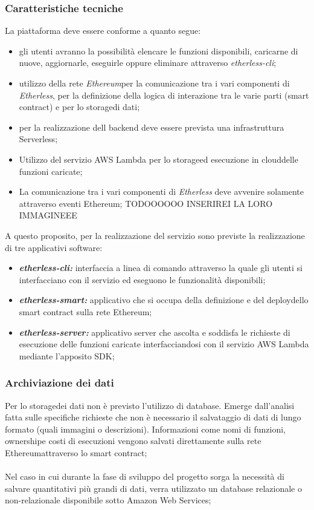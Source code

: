 \subsubsection{Caratteristiche tecniche}
La piattaforma deve essere conforme a quanto segue:
\begin{itemize}
	\item gli utenti avranno la possibilità elencare le funzioni disponibili,  caricarne di nuove, aggiornarle, eseguirle oppure eliminare attraverso \textit{etherless-cli};
	\item utilizzo della rete \textit{Ethereum}\glo per la comunicazione tra i vari componenti di \textit{Etherless}, per la definizione della logica di interazione tra le varie parti (smart contract\glo) e per lo storage\glo di dati;
	\item per la realizzazione dell backend deve essere prevista una infrastruttura Serverless\glo;
	\item Utilizzo del servizio AWS Lambda per lo storage\glo ed esecuzione in cloud\glo delle funzioni caricate;
	\item La comunicazione tra i vari componenti di \textit{Etherless} deve avvenire solamente attraverso eventi Ethereum\glo; TODOOOOOO INSERIREI LA LORO IMMAGINEEE

\end{itemize}
A questo proposito, per la realizzazione del servizio sono previste la realizzazione di tre applicativi software:
	\begin{itemize}
		\item \textbf{\textit{etherless-cli:}} interfaccia a linea di comando attraverso la quale gli utenti si interfacciano con il servizio ed eseguono le funzionalità disponibili;
		\item \textbf{\textit{etherless-smart:}} applicativo che si occupa della definizione e del deploy\glo dello smart contract sulla rete Ethereum;
		\item \textbf{\textit{etherless-server:}} applicativo server che ascolta e soddisfa le richieste di esecuzione delle funzioni caricate interfacciandosi con il servizio AWS Lambda mediante l'apposito SDK;
	\end{itemize}
	
\subsubsection{Archiviazione dei dati}
Per lo storage\glo dei dati non è previsto l'utilizzo di database. Emerge dall'analisi fatta sulle specifiche richieste che non è necessario il salvataggio di dati di lungo formato (quali immagini o descrizioni). Informazioni come nomi di funzioni, ownership\glo e costi di esecuzioni vengono salvati direttamente sulla rete Ethereum\glo attraverso lo smart contract\glo; 
\\\\
Nel caso in cui durante la fase di sviluppo del progetto sorga la necessità di salvare quantitativi più grandi di dati, verra utilizzato un database relazionale o non-relazionale disponibile sotto Amazon Web Services;

